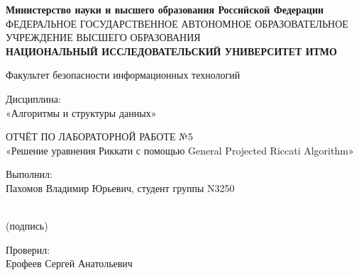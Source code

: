 \documentclass[12pt, a4paper, oneside]{extarticle}
\begin{document}
\begin{titlepage}
    \thispagestyle{empty}
    \begin{center}
        \fontsize{12pt}{14pt}\selectfont
        \textbf{Министерство науки и высшего образования Российской Федерации} \\
        ФЕДЕРАЛЬНОЕ ГОСУДАРСТВЕННОЕ АВТОНОМНОЕ ОБРАЗОВАТЕЛЬНОЕ \\
        УЧРЕЖДЕНИЕ ВЫСШЕГО ОБРАЗОВАНИЯ \\
        \textbf{НАЦИОНАЛЬНЫЙ ИССЛЕДОВАТЕЛЬСКИЙ УНИВЕРСИТЕТ ИТМО} \\

        \vfill

        Факультет безопасности информационных технологий

        \vfill

        Дисциплина: \\
        «Алгоритмы и структуры данных»
        \vfill

        ОТЧЁТ ПО ЛАБОРАТОРНОЙ РАБОТЕ №5 \\
        «Решение уравнения Риккати с помощью General Projected Riccati Algorithm»

        \vfill

        \hfill
        \begin{flushright}
            Выполнил: \\
            Пахомов Владимир Юрьевич, студент группы N3250 \\

            \vspace{1.5cm}

            \begin{minipage}{0.2\textwidth}
                \begin{center}
                    \underline{\hspace{3cm}} \\
                    \fontsize{9pt}{11pt}\selectfont
                    (подпись)
                \end{center}
            \end{minipage}

            \vspace{1.5cm}

            Проверил: \\
            Ерофеев Сергей Анатольевич

            \vspace{1.5cm}


\end{flushright}
\end{center}
\end{titlepage}
\end{document}
